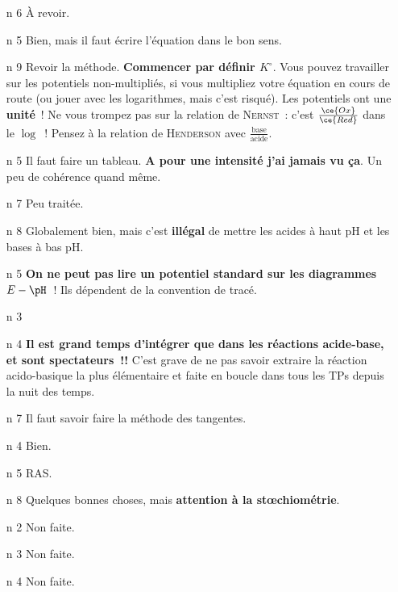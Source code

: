 \documentclass[a4paper, 10pt, final, garamond]{book}
\begin{document}
\begin{enumerate}[label=\sqenumi]
	\item[n]{6} %
	À revoir.
	\item[n]{5} %
	Bien, mais il faut écrire l'équation dans le bon sens.
	\item[n]{9} %
	Revoir la méthode. \textbf{Commencer par définir $K^\circ$}. Vous pouvez
	travailler sur les potentiels non-multipliés, si vous multipliez votre
	équation en cours de route (ou jouer avec les logarithmes, mais c'est
	risqué).
	\smallbreak
	Les potentiels ont une \textbf{unité}~! Ne vous trompez pas sur la relation de
	\textsc{Nernst}~: c'est $\frac{\ce{Ox}}{\ce{Red}}$ dans le $\log $~! Pensez à
	la relation de \textsc{Henderson} avec $\frac{\text{base}}{\text{acide}}$.
	\item[n]{5} %
	Il faut faire un tableau. \textbf{A pour une intensité j'ai jamais vu ça}. Un
	peu de cohérence quand même.
	\item[n]{7} %
	Peu traitée.
	\item[n]{8} %
	Globalement bien, mais c'est \textbf{illégal} de mettre les acides à haut pH
	et les bases à bas pH.
	\item[n]{5} %
	\textbf{On ne peut  pas lire un potentiel standard sur les
		diagrammes $E-\pH$}~! Ils dépendent de la convention de tracé.
	\item[n]{3} %
	\item[n]{4} %
	\textbf{Il est grand temps d'intégrer que dans les réactions acide-base,
		 et  sont spectateurs~!!} C'est grave de ne pas savoir
	extraire la réaction acido-basique la plus élémentaire et faite en boucle
	dans tous les TPs depuis la nuit des temps.
	\item[n]{7} %
	Il faut savoir faire la méthode des tangentes.
	\item[n]{4} %
	Bien.
	\item[n]{5} %
	RAS.
	\item[n]{8} %
	Quelques bonnes choses, mais \textbf{attention à la stœchiométrie}.
	\item[n]{2} %
	Non faite.
	\item[n]{3} %
	Non faite.
	\item[n]{4} %
	Non faite.
\end{enumerate}
\end{document}
